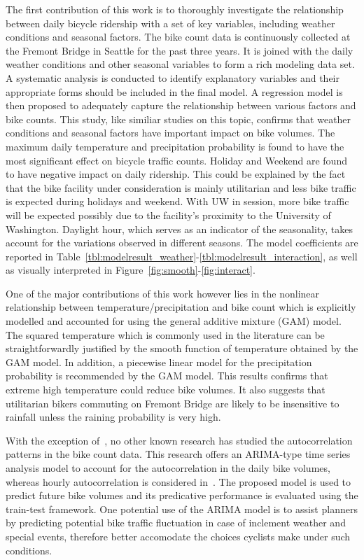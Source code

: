 \documentclass [11pt, proquest] {uwthesis}[2015/03/03]
\begin{document}
The first contribution of this work is to thoroughly investigate the relationship between daily bicycle ridership with a set of key variables, including weather conditions and seasonal factors. The bike count data is continuously collected at the Fremont Bridge in Seattle for the past three years. It is joined with the daily weather conditions and other seasonal variables to form a rich modeling data set. A systematic analysis is conducted to identify explanatory variables and their appropriate forms should be included in the final model. A regression model is then proposed to adequately capture the relationship between various factors and bike counts. This study, like similiar studies on this topic, confirms that weather conditions and seasonal factors have important impact on bike volumes. The maximum daily temperature and precipitation probability is found to have the most significant effect on bicycle traffic counts. Holiday and Weekend are found to have negative impact on daily ridership. This could be explained by the fact that the bike facility under consideration is mainly utilitarian and less bike traffic is expected during holidays and weekend. With UW in session, more bike traffic will be expected possibly due to the facility's proximity to the University of Washington. Daylight hour, which serves as an indicator of the seasonality, takes account for the variations observed in different seasons. The model coefficients are reported in Table~\ref{tbl:modelresult_weather}-\ref{tbl:modelresult_interaction}, as well as visually interpreted in Figure~\ref{fig:smooth}-\ref{fig:interact}.

One of the major contributions of this work however lies in the nonlinear relationship between temperature/precipitation and bike count which is explicitly modelled and accounted for using the general additive mixture (GAM) model. The squared temperature which is commonly used in the literature can be straightforwardly justified by the smooth function of temperature obtained by the GAM model. In addition, a piecewise linear model for the precipitation probability is recommended by the GAM model. This results confirms that extreme high temperature could reduce bike volumes. It also suggests that utilitarian bikers commuting on Fremont Bridge are likely to be insensitive to rainfall unless the raining probability is very high.

With the exception of~\cite{Gallop:2012aa,Nosal:2014aa}, no other known research has studied the autocorrelation patterns in the bike count data. This research offers an ARIMA-type time series analysis model to account for the autocorrelation in the daily bike volumes, whereas hourly autocorrelation is considered in~\cite{Gallop:2012aa,Nosal:2014aa}. The proposed model is used to predict future bike volumes and its predicative performance is evaluated using the train-test framework. One potential use of the ARIMA model is to assist planners by predicting potential bike traffic fluctuation in case of inclement weather and special events, therefore better accomodate the choices cyclists make under such conditions. 
\end{document}
